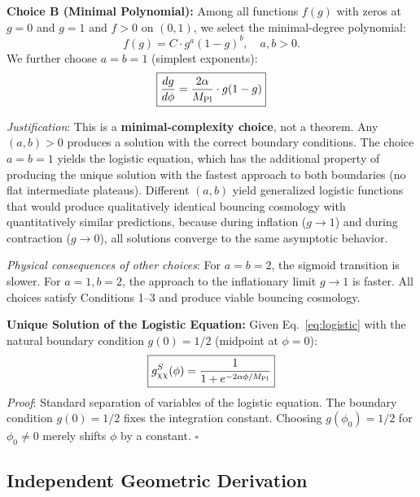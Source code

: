 \documentclass[11pt,a4paper]{article}
\begin{document}
\begin{occam_box}
\textbf{Choice B (Minimal Polynomial):} Among all functions $f(g)$ with zeros at $g=0$ and $g=1$ and $f > 0$ on $(0,1)$, we select the minimal-degree polynomial:
\begin{equation}
f(g) = C \cdot g^a (1-g)^b, \quad a, b > 0.
\end{equation}
We further choose $a = b = 1$ (simplest exponents):
\begin{equation}
\boxed{\frac{dg}{d\phi} = \frac{2\alpha}{M_{\rm Pl}} \cdot g(1-g)}
\label{eq:logistic}
\end{equation}

\textit{Justification}: This is a \textbf{minimal-complexity choice}, not a theorem. Any $(a,b) > 0$ produces a solution with the correct boundary conditions. The choice $a = b = 1$ yields the logistic equation, which has the additional property of producing the unique solution with the fastest approach to both boundaries (no flat intermediate plateaus). Different $(a,b)$ yield generalized logistic functions that would produce qualitatively identical bouncing cosmology with quantitatively similar predictions, because during inflation ($g \to 1$) and during contraction ($g \to 0$), all solutions converge to the same asymptotic behavior.

\textit{Physical consequences of other choices}: For $a = b = 2$, the sigmoid transition is slower. For $a=1, b=2$, the approach to the inflationary limit $g \to 1$ is faster. All choices satisfy Conditions 1--3 and produce viable bouncing cosmology.
\end{occam_box}

\begin{theorem_box}
\textbf{Unique Solution of the Logistic Equation:} Given Eq.~\eqref{eq:logistic} with the natural boundary condition $g(0) = 1/2$ (midpoint at $\phi = 0$):
\begin{equation}
\boxed{g_{\chi\chi}^S(\phi) = \frac{1}{1 + e^{-2\alpha\phi/M_{\rm Pl}}}}
\label{eq:sigmoid}
\end{equation}
\textit{Proof}: Standard separation of variables of the logistic equation. The boundary condition $g(0) = 1/2$ fixes the integration constant. Choosing $g(\phi_0) = 1/2$ for $\phi_0 \neq 0$ merely shifts $\phi$ by a constant. $\square$
\end{theorem_box}

\subsection{Independent Geometric Derivation}
\end{document}
